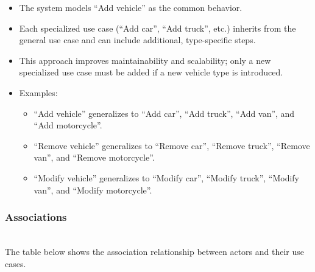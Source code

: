 \begin{itemize}
\item
\protect{}\label{uvMnf4mFvcXMOLRD_tC1a}
The system models ``Add vehicle'' as the common behavior.
\item
\protect{}\label{bZU0esoCZKS-tc0SEUqf5}
Each specialized use case (``Add car'', ``Add truck'', etc.) inherits from the general use case and can include additional, type-specific steps.
\item
\protect{}\label{kT4V6dcWMD8ZqtTdwzO8T}
This approach improves maintainability and scalability; only a new specialized use case must be added if a new vehicle type is introduced.
\item
\protect{}\label{SaZpGPAesSXnj30LOaJW0}
Examples:

\begin{itemize}
\item
``Add vehicle'' generalizes to ``Add car'', ``Add truck'', ``Add van'', and ``Add motorcycle''.
\item
``Remove vehicle'' generalizes to ``Remove car'', ``Remove truck'', ``Remove van'', and ``Remove motorcycle''.
\item
``Modify vehicle'' generalizes to ``Modify car'', ``Modify truck'', ``Modify van'', and ``Modify motorcycle''.
\end{itemize}
\end{itemize}

\subsubsection{Associations}\label{etla1FupQif0zTGH2yqvm}
\\
The table below shows the association relationship between actors and their use cases.

